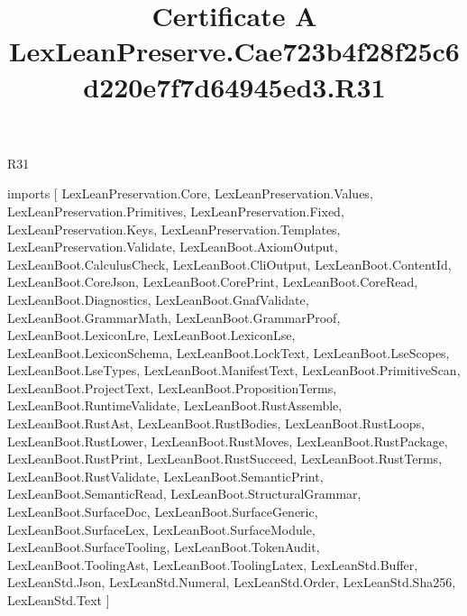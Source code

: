 \begin{lexlean}{R31}
\title{Certificate A LexLeanPreserve.Cae723b4f28f25c6d220e7f7d64945ed3.R31}
\begin{coremodule}
imports [
  LexLeanPreservation.Core,
  LexLeanPreservation.Values,
  LexLeanPreservation.Primitives,
  LexLeanPreservation.Fixed,
  LexLeanPreservation.Keys,
  LexLeanPreservation.Templates,
  LexLeanPreservation.Validate,
  LexLeanBoot.AxiomOutput,
  LexLeanBoot.CalculusCheck,
  LexLeanBoot.CliOutput,
  LexLeanBoot.ContentId,
  LexLeanBoot.CoreJson,
  LexLeanBoot.CorePrint,
  LexLeanBoot.CoreRead,
  LexLeanBoot.Diagnostics,
  LexLeanBoot.GnafValidate,
  LexLeanBoot.GrammarMath,
  LexLeanBoot.GrammarProof,
  LexLeanBoot.LexiconLre,
  LexLeanBoot.LexiconLse,
  LexLeanBoot.LexiconSchema,
  LexLeanBoot.LockText,
  LexLeanBoot.LseScopes,
  LexLeanBoot.LseTypes,
  LexLeanBoot.ManifestText,
  LexLeanBoot.PrimitiveScan,
  LexLeanBoot.ProjectText,
  LexLeanBoot.PropositionTerms,
  LexLeanBoot.RuntimeValidate,
  LexLeanBoot.RustAssemble,
  LexLeanBoot.RustAst,
  LexLeanBoot.RustBodies,
  LexLeanBoot.RustLoops,
  LexLeanBoot.RustLower,
  LexLeanBoot.RustMoves,
  LexLeanBoot.RustPackage,
  LexLeanBoot.RustPrint,
  LexLeanBoot.RustSucceed,
  LexLeanBoot.RustTerms,
  LexLeanBoot.RustValidate,
  LexLeanBoot.SemanticPrint,
  LexLeanBoot.SemanticRead,
  LexLeanBoot.StructuralGrammar,
  LexLeanBoot.SurfaceDoc,
  LexLeanBoot.SurfaceGeneric,
  LexLeanBoot.SurfaceLex,
  LexLeanBoot.SurfaceModule,
  LexLeanBoot.SurfaceTooling,
  LexLeanBoot.TokenAudit,
  LexLeanBoot.ToolingAst,
  LexLeanBoot.ToolingLatex,
  LexLeanStd.Buffer,
  LexLeanStd.Json,
  LexLeanStd.Numeral,
  LexLeanStd.Order,
  LexLeanStd.Sha256,
  LexLeanStd.Text
]


\end{coremodule}
\end{lexlean}
